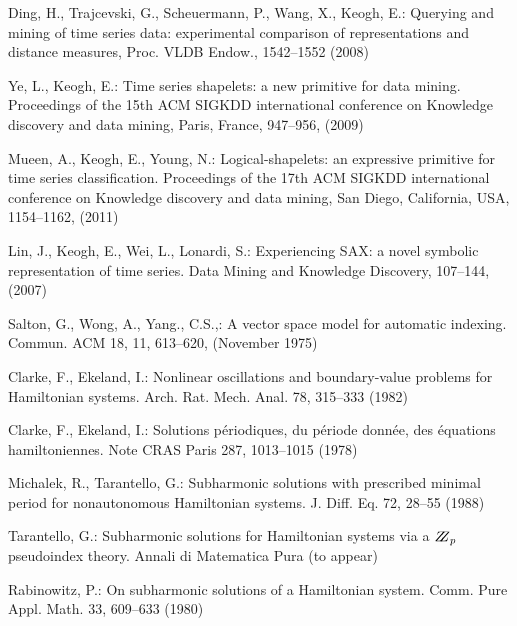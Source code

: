 \documentclass{llncs}
\begin{document}
%
%
\begin{thebibliography}{5}
%

Ding, H., Trajcevski, G., Scheuermann, P., Wang, X., Keogh, E.:
Querying and mining of time series data: experimental comparison of representations and distance measures,
Proc. VLDB Endow., 1542--1552 (2008)

Ye, L., Keogh, E.:
Time series shapelets: a new primitive for data mining.
Proceedings of the 15th ACM SIGKDD international conference on Knowledge discovery and data mining,
Paris, France, 947--956, (2009)

Mueen, A., Keogh, E., Young, N.:
Logical-shapelets: an expressive primitive for time series classification.
Proceedings of the 17th ACM SIGKDD international conference on Knowledge discovery and data mining,
San Diego, California, USA, 1154--1162, (2011)

Lin, J., Keogh, E., Wei, L., Lonardi, S.:
Experiencing SAX: a novel symbolic representation of time series.
Data Mining and Knowledge Discovery, 107--144, (2007)

Salton, G., Wong, A., Yang., C.S.,:
A vector space model for automatic indexing. 
Commun. ACM 18, 11, 613--620, (November 1975)

Clarke, F., Ekeland, I.:
Nonlinear oscillations and
boundary-value problems for Hamiltonian systems.
Arch. Rat. Mech. Anal. 78, 315--333 (1982)

Clarke, F., Ekeland, I.:
Solutions p\'{e}riodiques, du
p\'{e}riode donn\'{e}e, des \'{e}quations hamiltoniennes.
Note CRAS Paris 287, 1013--1015 (1978)

Michalek, R., Tarantello, G.:
Subharmonic solutions with prescribed minimal
period for nonautonomous Hamiltonian systems.
J. Diff. Eq. 72, 28--55 (1988)

Tarantello, G.:
Subharmonic solutions for Hamiltonian
systems via a $\bbbz_{p}$ pseudoindex theory.
Annali di Matematica Pura (to appear)

Rabinowitz, P.:
On subharmonic solutions of a Hamiltonian system.
Comm. Pure Appl. Math. 33, 609--633 (1980)

\end{thebibliography}

%
\end{document}
